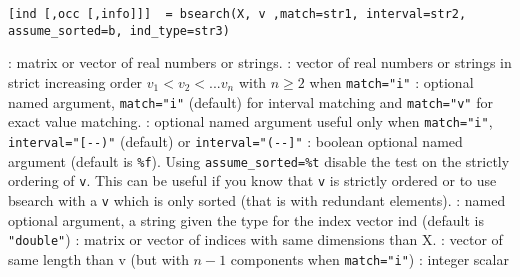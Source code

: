 

\begin{mandesc}
\end{mandesc}

\begin{calling_sequence}
\begin{verbatim}
[ind [,occ [,info]]]  = bsearch(X, v ,match=str1, interval=str2, assume_sorted=b, ind_type=str3)
\end{verbatim}
\end{calling_sequence}
\begin{parameters}
  \begin{varlist}
    :  matrix or vector of real numbers or strings.
    : vector of real numbers or strings in strict
    increasing order  $v_1 <  v_2 < ... v_n$ with $n \ge 2$ 
    when  \verb+match="i"+
    : optional named argument, \verb+match="i"+
                         (default) for interval matching and
                         \verb+match="v"+ for exact value matching.
    : optional named argument useful only
                           when  \verb+match="i"+, \verb+interval="[--)"+
                         (default) or  \verb+interval="(--]"+
    : boolean optional named argument (default
                              is \verb+%f+). Using \verb+assume_sorted=%t+ disable the test
                              on the strictly ordering of
                              \verb+v+. This can be useful if you know
                              that \verb+v+ is strictly ordered or to
                              use bsearch with a \verb+v+ which is
                              only sorted (that is with redundant elements).  
    : named optional argument, a string given the type for the index vector ind (default is \verb+"double"+)
    : matrix or vector of indices with same dimensions than X.
    : vector of same length than v (but with $n-1$ components 
                  when  \verb+match="i"+)
    : integer scalar
  \end{varlist}
\end{parameters}

